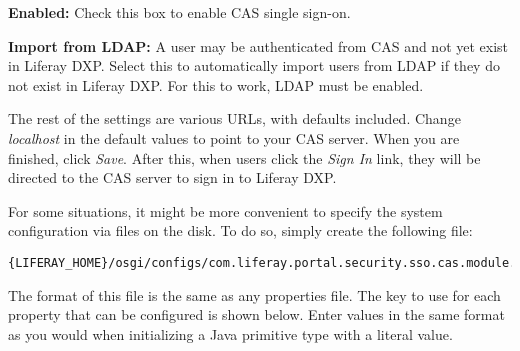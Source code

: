 \textbf{Enabled:} Check this box to enable CAS single sign-on.

\textbf{Import from LDAP:} A user may be authenticated from CAS and not
yet exist in Liferay DXP. Select this to automatically import users from
LDAP if they do not exist in Liferay DXP. For this to work, LDAP must be
enabled.

The rest of the settings are various URLs, with defaults included.
Change \emph{localhost} in the default values to point to your CAS
server. When you are finished, click \emph{Save}. After this, when users
click the \emph{Sign In} link, they will be directed to the CAS server
to sign in to Liferay DXP.

For some situations, it might be more convenient to specify the system
configuration via files on the disk. To do so, simply create the
following file:

\begin{verbatim}
{LIFERAY_HOME}/osgi/configs/com.liferay.portal.security.sso.cas.module.configuration.CASConfiguration.cfg
\end{verbatim}

The format of this file is the same as any properties file. The key to
use for each property that can be configured is shown below. Enter
values in the same format as you would when initializing a Java
primitive type with a literal value.

